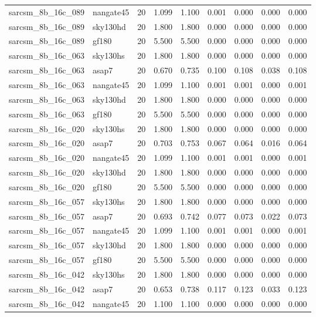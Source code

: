 \begin{tabular}{llrrrrrrr}
sarcsm\_8b\_16c\_089 & nangate45 & 20 & 1.099 & 1.100 & 0.001 & 0.000 & 0.000 & 0.000 \\
sarcsm\_8b\_16c\_089 & sky130hd & 20 & 1.800 & 1.800 & 0.000 & 0.000 & 0.000 & 0.000 \\
sarcsm\_8b\_16c\_089 & gf180 & 20 & 5.500 & 5.500 & 0.000 & 0.000 & 0.000 & 0.000 \\
sarcsm\_8b\_16c\_063 & sky130hs & 20 & 1.800 & 1.800 & 0.000 & 0.000 & 0.000 & 0.000 \\
sarcsm\_8b\_16c\_063 & asap7 & 20 & 0.670 & 0.735 & 0.100 & 0.108 & 0.038 & 0.108 \\
sarcsm\_8b\_16c\_063 & nangate45 & 20 & 1.099 & 1.100 & 0.001 & 0.001 & 0.000 & 0.001 \\
sarcsm\_8b\_16c\_063 & sky130hd & 20 & 1.800 & 1.800 & 0.000 & 0.000 & 0.000 & 0.000 \\
sarcsm\_8b\_16c\_063 & gf180 & 20 & 5.500 & 5.500 & 0.000 & 0.000 & 0.000 & 0.000 \\
sarcsm\_8b\_16c\_020 & sky130hs & 20 & 1.800 & 1.800 & 0.000 & 0.000 & 0.000 & 0.000 \\
sarcsm\_8b\_16c\_020 & asap7 & 20 & 0.703 & 0.753 & 0.067 & 0.064 & 0.016 & 0.064 \\
sarcsm\_8b\_16c\_020 & nangate45 & 20 & 1.099 & 1.100 & 0.001 & 0.001 & 0.000 & 0.001 \\
sarcsm\_8b\_16c\_020 & sky130hd & 20 & 1.800 & 1.800 & 0.000 & 0.000 & 0.000 & 0.000 \\
sarcsm\_8b\_16c\_020 & gf180 & 20 & 5.500 & 5.500 & 0.000 & 0.000 & 0.000 & 0.000 \\
sarcsm\_8b\_16c\_057 & sky130hs & 20 & 1.800 & 1.800 & 0.000 & 0.000 & 0.000 & 0.000 \\
sarcsm\_8b\_16c\_057 & asap7 & 20 & 0.693 & 0.742 & 0.077 & 0.073 & 0.022 & 0.073 \\
sarcsm\_8b\_16c\_057 & nangate45 & 20 & 1.099 & 1.100 & 0.001 & 0.001 & 0.000 & 0.001 \\
sarcsm\_8b\_16c\_057 & sky130hd & 20 & 1.800 & 1.800 & 0.000 & 0.000 & 0.000 & 0.000 \\
sarcsm\_8b\_16c\_057 & gf180 & 20 & 5.500 & 5.500 & 0.000 & 0.000 & 0.000 & 0.000 \\
sarcsm\_8b\_16c\_042 & sky130hs & 20 & 1.800 & 1.800 & 0.000 & 0.000 & 0.000 & 0.000 \\
sarcsm\_8b\_16c\_042 & asap7 & 20 & 0.653 & 0.738 & 0.117 & 0.123 & 0.033 & 0.123 \\
sarcsm\_8b\_16c\_042 & nangate45 & 20 & 1.100 & 1.100 & 0.000 & 0.000 & 0.000 & 0.000 \\

\end{tabular}
